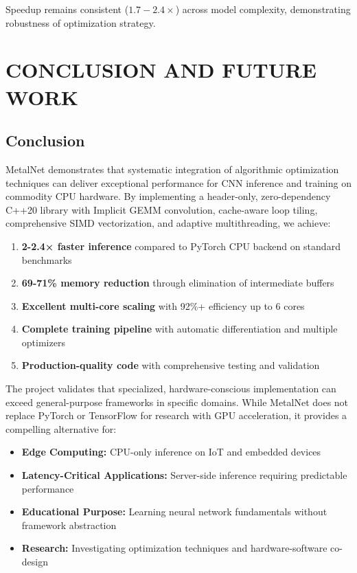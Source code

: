 \documentclass[12pt,oneside,a4paper]{report}
\begin{document}
Speedup remains consistent ($1.7-2.4\times$) across model complexity, demonstrating robustness of optimization strategy.

\newpage

\chapter{CONCLUSION AND FUTURE WORK}

\section{Conclusion}

MetalNet demonstrates that systematic integration of algorithmic optimization techniques can deliver exceptional performance for CNN inference and training on commodity CPU hardware. By implementing a header-only, zero-dependency C++20 library with Implicit GEMM convolution, cache-aware loop tiling, comprehensive SIMD vectorization, and adaptive multithreading, we achieve:

\begin{enumerate}
    \item \textbf{2-2.4× faster inference} compared to PyTorch CPU backend on standard benchmarks
    \item \textbf{69-71\% memory reduction} through elimination of intermediate buffers
    \item \textbf{Excellent multi-core scaling} with 92\%+ efficiency up to 6 cores
    \item \textbf{Complete training pipeline} with automatic differentiation and multiple optimizers
    \item \textbf{Production-quality code} with comprehensive testing and validation
\end{enumerate}

The project validates that specialized, hardware-conscious implementation can exceed general-purpose frameworks in specific domains. While MetalNet does not replace PyTorch or TensorFlow for research with GPU acceleration, it provides a compelling alternative for:

\begin{itemize}
    \item \textbf{Edge Computing:} CPU-only inference on IoT and embedded devices
    \item \textbf{Latency-Critical Applications:} Server-side inference requiring predictable performance
    \item \textbf{Educational Purpose:} Learning neural network fundamentals without framework abstraction
    \item \textbf{Research:} Investigating optimization techniques and hardware-software co-design
\end{itemize}
\end{document}
